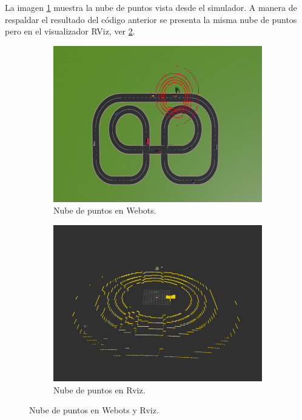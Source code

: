 La imagen \ref{fig:pc_webots} muestra la nube de puntos vista desde el simulador. A manera de respaldar el resultado del código anterior se presenta la misma nube de puntos pero en el visualizador RViz, ver \ref{fig:pc_rviz}.
\begin{figure}[h]
    \centering
    \begin{subfigure}[b]{0.4\textwidth}
         \centering
         \includegraphics[width=\textwidth]{Figures/Figures_Cap05/pc_webots.png}
         \caption{Nube de puntos en Webots.}
         \label{fig:pc_webots}
    \end{subfigure}
    \hfill
    \begin{subfigure}[b]{0.4\textwidth}
         \centering
         \includegraphics[width=\textwidth]{Figures/Figures_Cap05/pc_rviz.png}
         \caption{Nube de puntos en Rviz.}
         \label{fig:pc_rviz}
     \end{subfigure}
     
    \caption{Nube de puntos en Webots y Rviz.}
    \label{fig:pc_webots_rviz}
\end{figure}

